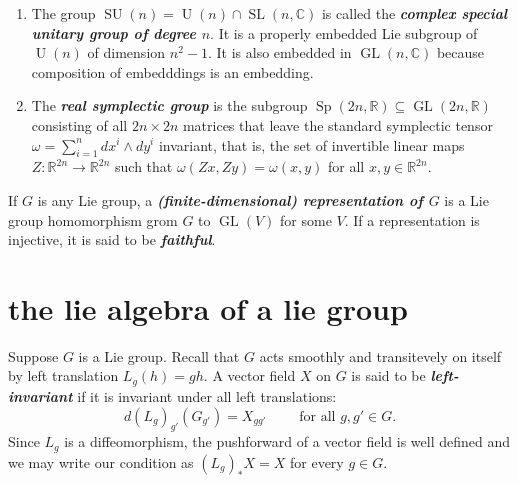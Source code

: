 \documentclass{article}
\numberwithin{equation}{section}
\newcommand{\R}{\mathbb{R}}
\newcommand{\C}{\mathbb{C}}
\DeclareMathOperator{\GL}{GL}
\DeclareMathOperator{\SL}{SL}
\DeclareMathOperator{\U}{U}
\DeclareMathOperator{\SU}{SU}
\DeclareMathOperator{\Sp}{Sp}
\begin{document}
\begin{example}
\begin{enumerate}
		\item The group $\SU(n)=\U(n)\cap\SL(n,\C)$ is called the \textbf{\textit{complex special unitary group of degree $n$}}. It is a properly embedded Lie subgroup of $\U(n)$ of dimension $n^2-1$. It is also embedded in $\GL(n,\C)$ because composition of embedddings is an embedding.
		\item The \textbf{\textit{real symplectic group}} is the subgroup $\Sp(2n,\R)\subseteq\GL(2n,\R)$ consisting of all $2n\times2n$ matrices that leave the standard symplectic tensor $\omega=\sum_{i=1}^ndx^i\wedge dy^i$ invariant, that is, the set of invertible linear maps $Z:\R^{2n}\to\R^{2n}$ such that $\omega(Zx,Zy)=\omega(x,y)$ for all $x,y\in\R^{2n}$.
	\end{enumerate}
\end{example}
\begin{defn}[Extra]
	If $G$ is any Lie group, a \textbf{\textit{(finite-dimensional) representation of $G$}} is a Lie group homomorphism grom $G$ to $\GL(V)$ for some $V$. If a representation is injective, it is said to be \textbf{\textit{faithful}}.
\end{defn}
\section{the lie algebra of a lie group}
Suppose $G$ is a Lie group. Recall that $G$ acts smoothly and transitevely on itself by left translation $L_g(h)=gh$. A vector field $X$ on $G$ is said to be \textbf{\textit{left-invariant}} if it is invariant under all left translations:
\[d(L_g)_{g'}(G_{g'})=X_{gg'}\qquad\text{ for all }g,g'\in G.\]
Since $L_g$ is a diffeomorphism, the pushforward of a vector field is well defined and we may write our condition as $(L_g)_*X=X$ for every $g\in G$.
\end{document}
